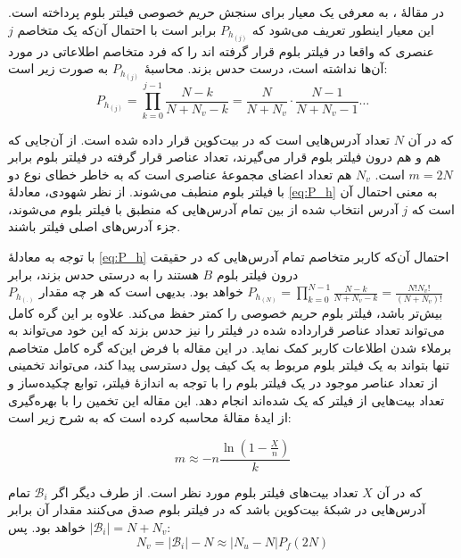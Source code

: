 در مقالهٔ \cite{Gervais2014}، به معرفی یک معیار برای سنجش حریم خصوصی  فیلتر بلوم پرداخته است. این معیار اینطور تعریف می‌شود که 
$P_{h_{(j)}}$
 برابر است با احتمال آن‌که یک متخاصم ‌$j$ عنصری که واقعا در فیلتر بلوم قرار گرفته اند را که فرد متخاصم اطلاعاتی در مورد آن‌ها نداشته است، درست حدس بزند. محاسبهٔ $P_{h_{(j)}}$ به صورت زیر است:
 \begin{equation}
 \label{eq:P_h}
 P_{h_{(j)}} = \prod_{k=0}^{j-1}\frac{N-k}{N+N_v-k} = \frac{N}{N+N_v}\cdot\frac{N-1}{N+N_v-1} \ldots
 \end{equation}
  
  که در آن $N$ تعداد آدرس‌هایی است که در بیت‌کوین قرار داده شده است. از آن‌جایی که هم  و هم  درون فیلتر بلوم قرار می‌گیرند، تعداد عناصر قرار گرفته در فیلتر بلوم برابر $m=2N$ است. $N_v$ هم تعداد اعضای مجموعه‌ٔ عناصری است که به خاطر خطای نوع دو با فیلتر بلوم منطبف می‌شوند. از نظر شهودی، معادلهٔ \eqref{eq:P_h} به معنی احتمال آن است که $j$ آدرس انتخاب شده از بین تمام آدرس‌هایی که منطبق با فیلتر بلوم می‌شوند، جزء آدرس‌های اصلی فیلتر باشند.
  
   با توجه به معادلهٔ \eqref{eq:P_h} احتمال آن‌که کاربر متخاصم تمام آدرس‌هایی که در حقیقت درون فیلتر بلوم $B$ هستند را به درستی حدس بزند، برابر 
  $P_{h_{(N)}} = \prod_{k=0}^{N-1}\frac{N-k}{N+N_v-k} = \frac{N!N_v!}{(N+N_v)!}$
  خواهد بود\cite{Gervais2014}. بدیهی است که هر چه مقدار $P_{h_{(.)}}$ بیش‌تر باشد،‌ فیلتر بلوم حریم خصوصی را کمتر حفظ می‌کند. علاوه بر این گره کامل می‌تواند تعداد عناصر قرارداده شده در فیلتر را نیز حدس بزند که این خود می‌تواند به برملاء شدن اطلاعات کاربر کمک نماید. در این مقاله با فرض این‌که گره کامل متخاصم تنها بتواند به یک فیلتر بلوم مربوط به یک کیف پول دسترسی پیدا کند، می‌تواند تخمینی از تعداد عناصر موجود در یک فیلتر بلوم را با توجه به اندازهٔ فیلتر، توابع چکیده‌ساز و تعداد بیت‌هایی از فیلتر که یک شده‌اند انجام دهد. این مقاله این تخمین را با بهره‌گیری از ایدهٔ مقالهٔ \cite{Swamidass2007} محاسبه کرده است که به شرح زیر است:
  
   \begin{equation}
  \label{eq:m_estimation}
 m \approx -n\frac{\ln\left(1-\frac{X}{n}\right)}{k}
  \end{equation}
 
 که در آن $X$ تعداد بیت‌های فیلتر بلوم مورد نظر است. از طرف دیگر  اگر 
 $\mathcal{B}_i$
 تمام آدرس‌هایی در شبکهٔ بیت‌کوین باشد که در فیلتر بلوم صدق می‌کنند مقدار آن برابر 
 $|\mathcal{B}_i| = N + N_v$
 خواهد بود. پس:
  \begin{equation}
 \label{eq:N_v_estimation}
 N_v = |\mathcal{B}_i| - N  \approx  |N_u-N|P_f(2N) 
 \end{equation}
 
